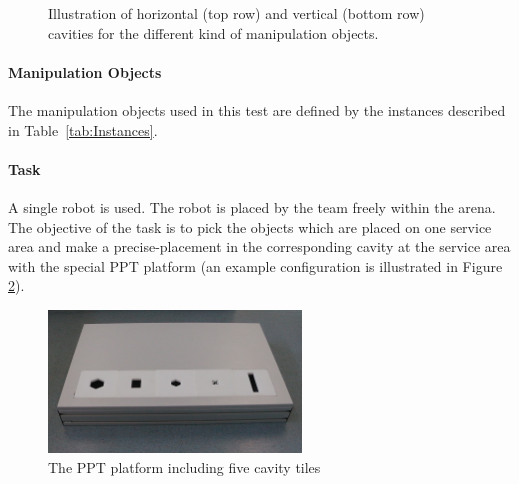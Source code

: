 \begin{figure} [h!]
\begin{center}
 \hspace{0.1cm}
  \hspace{0.1cm}
  \hspace{0.1cm}
\end{center}
\caption{Illustration of horizontal (top row) and vertical (bottom row) cavities for the different kind of manipulation objects.}
\label{fig:ppt_tiles}
\end{figure}


\paragraph{Manipulation Objects}
The manipulation objects used in this test are defined by the instances described in Table~\ref{tab:Instances}.

\paragraph{Task}
A single robot is used. The robot is placed by the team freely within the arena. The objective of the task is to pick the objects which are placed on one service area and make a precise-placement in the corresponding cavity at the service area with the special PPT platform (an example configuration is illustrated in Figure \ref{fig:ppt_plattform}). 

\begin{figure}
\centering
\includegraphics[width=0.6\textwidth ]{./images/ppt_plattform.jpg}
\caption{The PPT platform including five cavity tiles}
\label{fig:ppt_plattform}
\end{figure}

